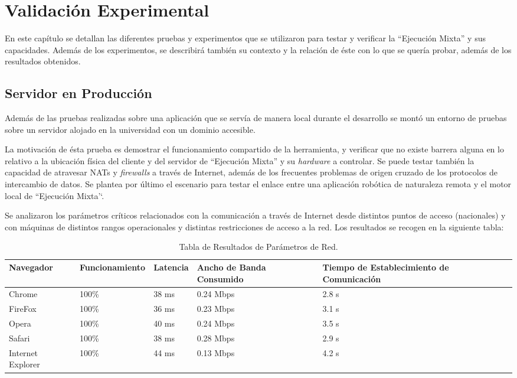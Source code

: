 \chapter{ Validación Experimental}

En este capítulo se detallan las diferentes pruebas y experimentos que se utilizaron para testar y verificar la ``Ejecución Mixta'' y sus capacidades. Además de los experimentos, se describirá también su contexto y la relación de éste con lo que se quería probar, además de los resultados obtenidos.

\section{Servidor en Producción}  
Además de las pruebas realizadas sobre una aplicación que se servía de manera local durante el desarrollo se montó un entorno de pruebas sobre un servidor alojado en la universidad con un dominio accesible.

La motivación de ésta prueba es demostrar el funcionamiento compartido de la herramienta, y verificar que no existe barrera alguna en lo relativo a la ubicación física del cliente y del servidor de ``Ejecución Mixta'' y su \textit{hardware} a controlar. Se puede testar también la capacidad de atravesar NATs y \textit{firewalls} a través de Internet, además de los frecuentes problemas de origen cruzado de los protocolos de intercambio de datos. Se plantea por último el escenario para testar el enlace entre una aplicación robótica de naturaleza remota y el motor local de ``Ejecución Mixta'`.

Se analizaron los parámetros críticos relacionados con la comunicación a través de Internet desde distintos puntos de acceso (nacionales) y con máquinas de distintos rangos operacionales y distintas restricciones de acceso a la red. Los resultados se recogen en la siguiente tabla:

\begin{table}[htbp]
\begin{center}
\begin{tabular}{| p{1.8cm}| p{2.6cm} | p{1.7cm}| p{2.4cm}| p{3cm}|}
\hline
Navegador & Funcionamiento & Latencia & Ancho de Banda Consumido & Tiempo de Establecimiento de Comunicación \\
\hline \hline
Chrome & 100\% & 38 ms & 0.24 Mbps & 2.8 s\\ \hline
FireFox & 100\% & 36 ms & 0.23 Mbps & 3.1 s\\ \hline
Opera & 100\% & 40 ms & 0.24 Mbps & 3.5 s\\ \hline
Safari & 100\% & 38 ms & 0.28 Mbps & 2.9 s\\ \hline
Internet Explorer & 100\% & 44 ms & 0.13 Mbps & 4.2 s\\ \hline
\end{tabular}
\caption{Tabla de Resultados de Parámetros de Red.}
\label{tabla:pros_cons}
\end{center}
\end{table}

